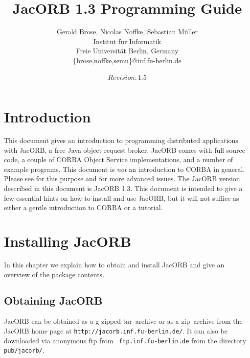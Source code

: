 \documentclass[12pt]{scrbook}
\title{JacORB 1.3 Programming Guide}
\author{Gerald Brose, Nicolas Noffke, Sebastian M\"uller\\
Institut f\"ur Informatik\\
Freie Universit\"at Berlin, Germany\\
\{brose,noffke,semu\}@inf.fu-berlin.de\\
\\
$Revision: 1.5 $
}
\begin{document}
\newcommand{\cmdline}[1]{\begin{small}\noindent \texttt{\$ #1}\end{small}}

\maketitle


\setlength{\parskip}{1.1ex}
\newpage
\tableofcontents

\chapter{Introduction}

This  document  gives   an  introduction  to  programming  distributed
applications with  JacORB, a free  Java object request  broker. JacORB
comes  with  full  source  code,  a couple  of  CORBA  Object  Service
implementations, and  a number of example programs.   This document is
{\it  not}   an  introduction  to   CORBA  in  general.    Please  see
\cite{Brose2001a,Siegel2000,   Vinoski1997}  for   this   purpose  and
\cite{Henning1999}  for  more  advanced  issues.  The  JacORB  version
described in this document is JacORB 1.3. This document is intended to
give a  few essential hints on how  to install and use  JacORB, but it
will  not  suffice as  either  a gentle  introduction  to  CORBA or  a
tutorial.


\chapter{Installing JacORB}
\label{Ch_installing}

In this chapter  we explain how to obtain and  install JacORB and give
an overview of the package contents.

\section{Obtaining JacORB}

JacORB can be obtained as a g-zipped tar--archive or as a zip--archive
from the  JacORB home page  at \verb+http://jacorb.inf.fu-berlin.de/+.
It   can   also   be   downloaded   via  anonymous   ftp   from   {\tt
ftp.inf.fu-berlin.de} from the directory {\tt pub/jacorb/}.
\end{document}
